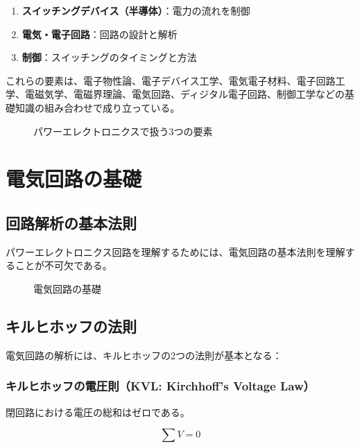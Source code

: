\begin{enumerate}
\item \textbf{スイッチングデバイス（半導体）}：電力の流れを制御
\item \textbf{電気・電子回路}：回路の設計と解析
\item \textbf{制御}：スイッチングのタイミングと方法
\end{enumerate}

これらの要素は、電子物性論、電子デバイス工学、電気電子材料、電子回路工学、電磁気学、電磁界理論、電気回路、ディジタル電子回路、制御工学などの基礎知識の組み合わせで成り立っている。

\begin{figure}[H]
\centering
{}
\caption{パワーエレクトロニクスで扱う3つの要素}
\label{fig:three_elements}
\end{figure}

\section{電気回路の基礎}

\subsection{回路解析の基本法則}

パワーエレクトロニクス回路を理解するためには、電気回路の基本法則を理解することが不可欠である。

\begin{figure}[H]
\centering
{}
\caption{電気回路の基礎}
\label{fig:circuit_basics}
\end{figure}

\subsection{キルヒホッフの法則}

電気回路の解析には、キルヒホッフの2つの法則が基本となる：

\subsubsection{キルヒホッフの電圧則（KVL: Kirchhoff's Voltage Law）}

閉回路における電圧の総和はゼロである。

\begin{equation}
\sum V = 0
\end{equation}

